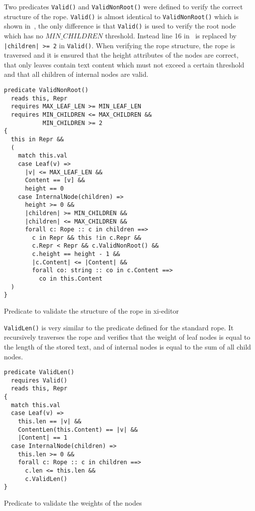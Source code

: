 Two predicates \texttt{Valid()} and \texttt{ValidNonRoot()} were defined to verify the correct structure of the rope.
\texttt{Valid()} is almost identical to \texttt{ValidNonRoot()} which is shown in~, the only difference is that \texttt{Valid()} is used to verify the root node which has no $MIN\_CHILDREN$ threshold.
Instead line 16 in~ is replaced by \texttt{|children| >= 2} in \texttt{Valid()}.
When verifying the rope structure, the rope is traversed and it is ensured that the height attributes of the nodes are correct, that only leaves contain text content which must not exceed a certain threshold and that all children of internal nodes are valid.


\begin{listing}[h!]
\begin{verbatim}
predicate ValidNonRoot()
  reads this, Repr
  requires MAX_LEAF_LEN >= MIN_LEAF_LEN
  requires MIN_CHILDREN <= MAX_CHILDREN &&
           MIN_CHILDREN >= 2
{
  this in Repr &&
  (
    match this.val
    case Leaf(v) =>
      |v| <= MAX_LEAF_LEN &&
      Content == [v] &&
      height == 0
    case InternalNode(children) =>
      height >= 0 &&
      |children| >= MIN_CHILDREN &&
      |children| <= MAX_CHILDREN &&
      forall c: Rope :: c in children ==>
        c in Repr && this !in c.Repr &&
        c.Repr < Repr && c.ValidNonRoot() &&
        c.height == height - 1 &&
        |c.Content| <= |Content| &&
        forall co: string :: co in c.Content ==>
          co in this.Content
  )
}
\end{verbatim}
    \caption{Predicate to validate the structure of the rope in xi-editor}
    \label{lst:xi-rope-valid}
\end{listing}

\texttt{ValidLen()} is very similar to the predicate defined for the standard rope.
It recursively traverses the rope and verifies that the weight of leaf nodes is equal to the length of the stored text, and of internal nodes is equal to the sum of all child nodes.

\begin{listing}[h!]
\begin{verbatim}
predicate ValidLen()
  requires Valid()
  reads this, Repr
{
  match this.val
  case Leaf(v) =>
    this.len == |v| &&
    ContentLen(this.Content) == |v| &&
    |Content| == 1
  case InternalNode(children) =>
    this.len >= 0 &&
    forall c: Rope :: c in children ==>
      c.len <= this.len &&
      c.ValidLen()
}
\end{verbatim}
    \caption{Predicate to validate the weights of the nodes}
    \label{lst:xi-rope-valid-len}
\end{listing}


